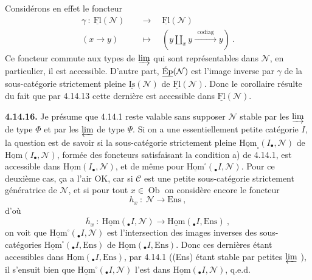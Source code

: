 \documentclass[11pt]{article}
\newcommand{\printedpage}[1]{\marginpar{\footnotesize p.~#1}}
\newcommand{\msp}[1]{\marginpar{\footnotesize [#1]}}
\newcommand{\uHom}{\underline{\mathrm{Hom}}}
\newcommand{\uFl}{\underline{\mathrm{Fl}}}
\newcommand{\uIs}{\underline{\mathrm{Is}}}
\newcommand{\uEp}{\underline{\textup{Ép}}}
\newcommand{\Ob}{\operatorname{Ob}}
\newcommand{\Ens}{\mathrm{Ens}}
\begin{document}
\printedpage{147}

\msp{page 388}
Considérons en effet le foncteur
\[
\begin{aligned}
\gamma \ : \ \uFl(\mathcal{N}) \quad &\longrightarrow \quad \uFl(\mathcal{N}) \\
(x \longrightarrow y) \quad &\longmapsto \quad (y \amalg_x y \xrightarrow{\ \ \text{codiag}\ \ } y) \ .
\end{aligned}
\]
Ce foncteur commute aux types de $\varinjlim$ qui sont représentables dans $\mathcal{N}$, en particulier, il est accessible. D'autre part, $\uEp(\mathcal{N})$ est l'image inverse par $\gamma$ de la sous-catégorie strictement pleine $\uIs(\mathcal{N})$ de $\uFl(\mathcal{N})$. Donc le corollaire résulte du fait que par 4.14.13 cette dernière est accessible dans $\uFl(\mathcal{N})$.

\textbf{4.14.16.} Je présume que 4.14.1 reste valable sans supposer $\mathcal{N}$ stable par les $\varinjlim$ de type $\Phi$ et par les $\varprojlim$ de type $\Psi$. Si on a une essentiellement petite catégorie $I$, la question est de savoir si la sous-catégorie strictement pleine $\uHom_{\square}(I_\bullet,\mathcal{N})$ de $\uHom(I_\bullet,\mathcal{N})$, formée des foncteurs satisfaisant
\msp{page 389}
la condition a) de 4.14.1, est accessible dans $\uHom(I_\bullet,\mathcal{N})$, et de même pour $\uHom^{\square}({}_\bullet I,\mathcal{N})$. Pour ce deuxième cas, ça a l'air OK, car si $\mathcal{C}$ est une petite sous-catégorie strictement génératrice de $\mathcal{N}$, et si pour tout $x \in \Ob$ on considère encore le foncteur
\[
h_x \ : \ \mathcal{N} \longrightarrow \Ens \ ,
\]
d'où
\[
\bar{h}_x \ : \ \uHom({}_\bullet I,\mathcal{N}) \longrightarrow \uHom({}_\bullet I,\Ens) \ ,
\]
on voit que $\uHom^{\square}({}_\bullet I,\mathcal{N})$ est l'intersection des images inverses des sous-catégories $\uHom^{\square}({}_\bullet I,\Ens)$ de $\uHom({}_\bullet I,\Ens)$. Donc ces dernières étant accessibles dans $\uHom({}_\bullet I,\Ens)$, par 4.14.1 ((Ens) étant stable par petites $\varprojlim$ ), il s'ensuit bien que $\uHom^{\square}({}_\bullet I,\mathcal{N})$ l'est dans $\uHom({}_\bullet I,\mathcal{N})$, q.e.d.
\end{document}
